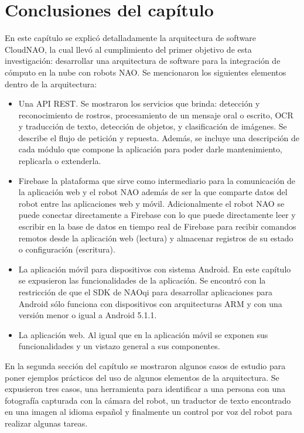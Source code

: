 \documentclass[letterpaper,12pt,spanish]{report}
\begin{document}
\section*{Conclusiones del capítulo}
En este capítulo se explicó detalladamente la arquitectura
de software CloudNAO, la cual llevó al
cumplimiento del primer objetivo
de esta investigación: desarrollar una arquitectura de 
software para la integración de cómputo en
la nube con robots NAO. Se mencionaron los 
siguientes elementos dentro de la 
arquitectura:

\begin{itemize}
    \item Una API REST. Se mostraron los servicios que brinda: detección y reconocimiento de 
    rostros, procesamiento de un mensaje oral o escrito,
    OCR y traducción de texto, detección de objetos,
    y clasificación de imágenes. Se describe
    el flujo de petición y repuesta. Además, se incluye una descripción de cada módulo que compone la aplicación para poder darle mantenimiento, replicarla o extenderla. 
    \item Firebase la plataforma que sirve como intermediario para la comunicación de la aplicación web y el robot NAO además de ser
    la que comparte datos del robot entre las aplicaciones
    web y móvil. Adicionalmente
    el robot NAO se puede
    conectar directamente a Firebase con lo que puede directamente
    leer y escribir en la base
    de datos en tiempo real de Firebase
    para recibir comandos remotos 
    desde la aplicación web (lectura) y almacenar
    registros de su estado o configuración (escritura).

    \item La aplicación móvil para dispositivos con
sistema Android. En este capítulo se expusieron las funcionalidades de la aplicación. Se encontró con la restricción de que el SDK de NAOqi para desarrollar aplicaciones para
Android sólo funciona con 
dispositivos con arquitecturas ARM
y con una versión menor o igual a Android 5.1.1.
\item La aplicación web. Al igual que en la aplicación móvil se exponen sus funcionalidades y un vistazo general
a sus componentes.
\end{itemize}

En la segunda sección del capítulo
se mostraron algunos casos de estudio para poner ejemplos
prácticos del uso de algunos elementos de la arquitectura.
Se expusieron tres casos, una herramienta para
identificar a una persona con una
fotografía capturada con la cámara
del robot, un traductor de texto
encontrado en una imagen
al idioma español y finalmente 
un control por voz del robot
para realizar algunas tareas.
\end{document}
